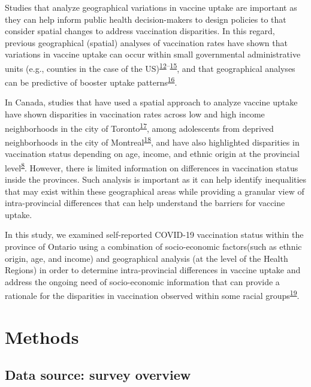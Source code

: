 \documentclass[
  letterpaper,
  DIV=11,
  numbers=noendperiod]{scrartcl}
\begin{document}
Studies that analyze geographical variations in vaccine uptake are
important as they can help inform public health decision-makers to
design policies to that consider spatial changes to address vaccination
disparities. In this regard, previous geographical (spatial) analyses of
vaccination rates have shown that variations in vaccine uptake can occur
within small governmental administrative units (e.g., counties in the
case of the
US)\textsuperscript{\protect\hyperlink{ref-mollalo2021}{12}--\protect\hyperlink{ref-bhuiyan2022}{15}},
and that geographical analyses can be predictive of booster uptake
patterns\textsuperscript{\protect\hyperlink{ref-wood2022}{16}}.

In Canada, studies that have used a spatial approach to analyze vaccine
uptake have shown disparities in vaccination rates across low and high
income neighborhoods in the city of
Toronto\textsuperscript{\protect\hyperlink{ref-choi2021}{17}}, among
adolescents from deprived neighborhoods in the city of
Montreal\textsuperscript{\protect\hyperlink{ref-mckinnon2021}{18}}, and
have also highlighted disparities in vaccination status depending on
age, income, and ethnic origin at the provincial
level\textsuperscript{\protect\hyperlink{ref-guay2022}{8}}. However,
there is limited information on differences in vaccination status inside
the provinces. Such analysis is important as it can help identify
inequalities that may exist within these geographical areas while
providing a granular view of intra-provincial differences that can help
understand the barriers for vaccine uptake.

In this study, we examined self-reported COVID-19 vaccination status
within the province of Ontario using a combination of socio-economic
factors(such as ethnic origin, age, and income) and geographical
analysis (at the level of the Health Regions) in order to determine
intra-provincial differences in vaccine uptake and address the ongoing
need of socio-economic information that can provide a rationale for the
disparities in vaccination observed within some racial
groups\textsuperscript{\protect\hyperlink{ref-cnat2022b}{19}}.

\hypertarget{methods}{%
\section{Methods}\label{methods}}

\hypertarget{data-source-survey-overview}{%
\subsection{Data source: survey
overview}\label{data-source-survey-overview}}
\end{document}
